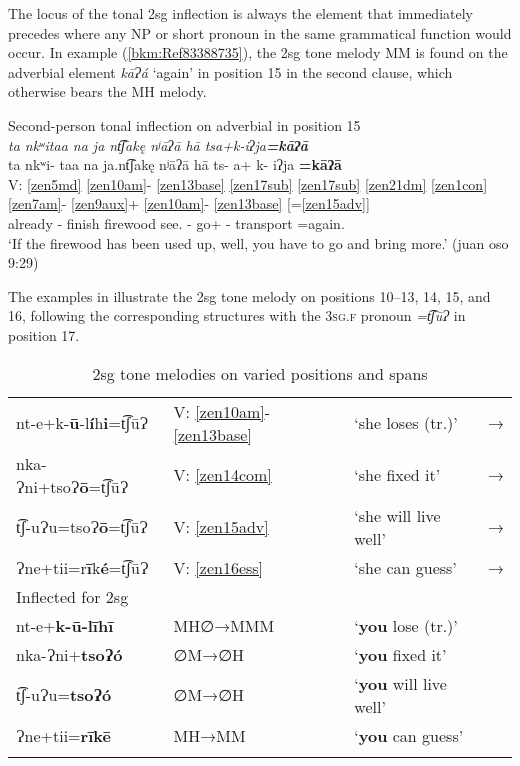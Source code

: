 \documentclass[output=paper]{langscibook}
\begin{document}
 
The locus of the tonal 2sg inflection is always the element that immediately precedes where any NP or short pronoun in the same grammatical function would occur. In example (\ref{bkm:Ref83388735}), the 2sg tone melody MM is found on the adverbial element \textit{kāɁá} `again' in position 15 in the second clause, which otherwise bears the MH melody.


\ea\label{bkm:Ref83388735}Second-person tonal inflection on adverbial in position 15\\
\textit{ta nkʷitaa na ja nt͡ʃakę nʲāʔā hā tsa+k-iʔja\textbf{=kāʔā}}\\
\glll {} ta nkʷi- taa na ja.nt͡ʃakę nʲāʔā hā ts- a+ k- iʔja \textbf{=kāʔā}\\
V: \ref{zen5md} \ref{zen10am}{}- \ref{zen13base} \ref{zen17sub} \ref{zen17sub} \ref{zen21dm} \ref{zen1con} \ref{zen7am}{}- \ref{zen9aux}+ \ref{zen10am}{}- \ref{zen13base} [=\ref{zen15adv}] \\ 
{} already \Pfv{}- finish \Def{} firewood see.\Second\Sg{} \Conj{} \Pot{}- go+ \Pot{}- transport =again.\Second\Sg{}\\
\glt `If the firewood has been used up, well, you have to go and bring more.' (juan oso 9:29)
\z 

The examples in  illustrate the 2sg tone melody on positions 10{}--13, 14, 15, and 16, following the corresponding structures with the 3\textsc{sg.f} pronoun \textit{=t͡ʃūɁ} in position 17.

\begin{table}
    \caption{2sg tone melodies on varied positions and spans}
    \label{tab:zenz:key:7}
    \centering
    \begin{tabular}{llll}
        \lsptoprule
    \multicolumn{4}{l}{Inflected for 3\textsc{sg.f}} \\ \midrule
    nt-e+k-\textbf{ū}{}-l\textbf{í}h\textbf{i}=t͡ʃūɁ  & V: \ref{zen10am}-\ref{zen13base} & `she loses (tr.)'    & → \\
    nka-Ɂni+tsoɁ\textbf{ō}=t͡ʃūɁ                      & V: \ref{zen14com}                & `she fixed it'       & →  \\
    t͡ʃ-uɁu=tsoɁ\textbf{ō}=t͡ʃūɁ                       & V: \ref{zen15adv}                & `she will live well' & →  \\
    {}Ɂne+tii=r\textbf{ī}k\textbf{é}=t͡ʃūɁ            & V: \ref{zen16ess}                & `she can guess'      & →  \\\midrule
    \multicolumn{4}{l}{Inflected for 2sg} \\ \midrule
     nt-e+\textbf{k-ū-līhī}  & MH∅→MMM & `\textbf{you} lose (tr.)'  & \\
     nka-Ɂni+\textbf{tsoɁó}  & ∅M→∅H & `\textbf{you} fixed it'  & \\
     t͡ʃ-uɁu=\textbf{tsoɁó}   & ∅M→∅H & `\textbf{you} will live well'  & \\
     Ɂne+tii=\textbf{rīkē}   & MH→MM & `\textbf{you} can guess'  & \\
    \lspbottomrule
    \end{tabular}
\end{table}
\end{document}
